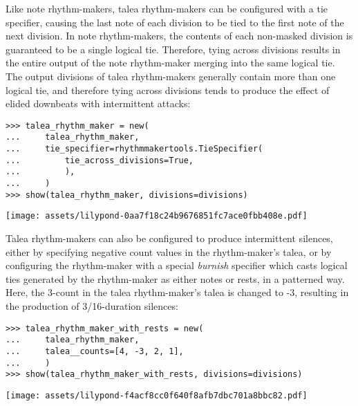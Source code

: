 \noindent Like note rhythm-makers, talea rhythm-makers can be configured with a
tie specifier, causing the last note of each division to be tied to the first
note of the next division. In note rhythm-makers, the contents of each
non-masked division is guaranteed to be a single logical tie. Therefore, tying
across divisions results in the entire output of the note rhythm-maker merging
into the same logical tie. The output divisions of talea rhythm-makers
generally contain more than one logical tie, and therefore tying across
divisions tends to produce the effect of elided downbeats with intermittent
attacks:

\begin{comment}
<abjad>
talea_rhythm_maker = new(
    talea_rhythm_maker,
    tie_specifier=rhythmmakertools.TieSpecifier(
        tie_across_divisions=True,
        ),
    )
show(talea_rhythm_maker, divisions=divisions)
</abjad>
\end{comment}

\begin{singlespacing}
\vspace{-0.5\baselineskip}
\begin{lstlisting}
>>> talea_rhythm_maker = new(
...     talea_rhythm_maker,
...     tie_specifier=rhythmmakertools.TieSpecifier(
...         tie_across_divisions=True,
...         ),
...     )
>>> show(talea_rhythm_maker, divisions=divisions)
\end{lstlisting}
\noindent\texttt{[image: assets/lilypond-0aa7f18c24b9676851fc7ace0fbb408e.pdf]}
\end{singlespacing}

\noindent Talea rhythm-makers can also be configured to produce intermittent
silences, either by specifying negative count values in the rhythm-maker's
talea, or by configuring the rhythm-maker with a special \emph{burnish}
specifier which casts logical ties generated by the rhythm-maker as either
notes or rests, in a patterned way. Here, the 3-count in the talea
rhythm-maker's talea is changed to -3, resulting in the production of
3/16-duration silences:

\begin{comment}
<abjad>
talea_rhythm_maker_with_rests = new(
    talea_rhythm_maker,
    talea__counts=[4, -3, 2, 1],
    )
show(talea_rhythm_maker_with_rests, divisions=divisions)
</abjad>
\end{comment}

\begin{singlespacing}
\vspace{-0.5\baselineskip}
\begin{lstlisting}
>>> talea_rhythm_maker_with_rests = new(
...     talea_rhythm_maker,
...     talea__counts=[4, -3, 2, 1],
...     )
>>> show(talea_rhythm_maker_with_rests, divisions=divisions)
\end{lstlisting}
\noindent\texttt{[image: assets/lilypond-f4acf8cc0f640f8afb7dbc701a8bbc82.pdf]}
\end{singlespacing}

